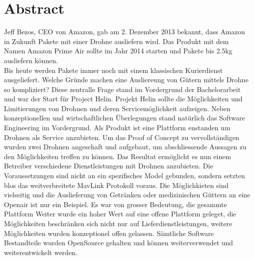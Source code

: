 \newpage
{}
\chapter*{Abstract}
Jeff Bezos, CEO von Amazon, gab am 2. Dezember 2013 bekannt, dass Amazon in Zukunft Pakete mit einer Drohne ausliefern wird. Das Produkt mit dem Namen Amazon Prime Air sollte im Jahr 2014 starten und Pakete bis 2.5kg ausliefern können. \\
Bis heute werden Pakete immer noch mit einem klassischen Kurierdienst ausgeliefert. Welche Gründe machen eine Ausliereung von Gütern mittels Drohne so kompliziert? Diese zentralle Frage stand im Vordergrund der Bachelorarbeit und war der Start für Project Helin. 
Projekt Helin sollte die Möglichkeiten und Limitierungen von Drohnen und deren Servicemöglichkeit aufzeigen.
Neben konzeptionellen und wirtschaftlichen Überlegungen stand natürlich das Software Engineering im Vordergrund. Als Produkt ist eine Plattform enstanden um Drohnen als Service anzubieten. Um das Proof of Concept zu vervollständigen wurden zwei Drohnen angeschaft und aufgebaut, um abschliessende Aussagen zu den Möglichkeiten treffen zu können. Das Resultat ermöglicht es nun einem Betreiber verschiedene Dienstleistungen mit Drohnen anzubieten. Die Voraussetzungen sind nicht an ein spezifisches Model gebunden, sondern setzten blos das weitverbreitete MavLink Protokoll voraus. Die Möglichkieten sind vielseitig und die Auslieferung von Getränken oder medizinischen Güttern an eine Openair ist nur ein Beispiel. Es war von grosser Bedeutung, die gesammte Plattform  Weiter wurde ein hoher Wert auf eine offene Plattform geleget, die Möglichkeiten beschränken sich nicht nur auf Lieferdienstleistungen, weitere Möglichkeiten wurden konzeptionel offen gelassen. Sämtliche Software Bestandteile wurden OpenSource gehalten und können weiterverwendet und weiterentwickelt werden.